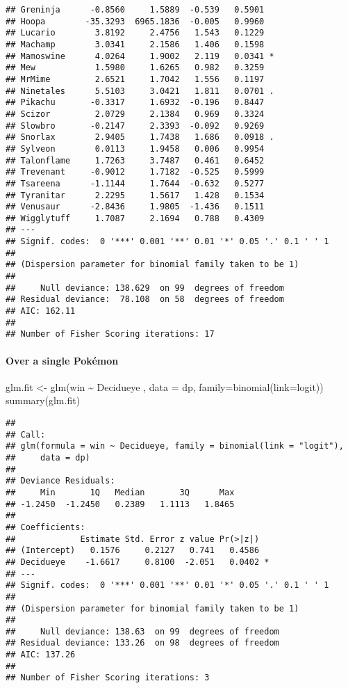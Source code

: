 \documentclass[
]{article}
\newenvironment{Shaded}{\begin{snugshade}}{\end{snugshade}}
\newcommand{\AttributeTok}[1]{\textcolor[rgb]{0.77,0.63,0.00}{#1}}
\newcommand{\FunctionTok}[1]{\textcolor[rgb]{0.00,0.00,0.00}{#1}}
\newcommand{\NormalTok}[1]{#1}
\newcommand{\OtherTok}[1]{\textcolor[rgb]{0.56,0.35,0.01}{#1}}
\newcommand{\SpecialCharTok}[1]{\textcolor[rgb]{0.00,0.00,0.00}{#1}}
\newcommand{\StringTok}[1]{\textcolor[rgb]{0.31,0.60,0.02}{#1}}
\begin{document}
\begin{verbatim}
## Greninja      -0.8560     1.5889  -0.539   0.5901  
## Hoopa        -35.3293  6965.1836  -0.005   0.9960  
## Lucario        3.8192     2.4756   1.543   0.1229  
## Machamp        3.0341     2.1586   1.406   0.1598  
## Mamoswine      4.0264     1.9002   2.119   0.0341 *
## Mew            1.5980     1.6265   0.982   0.3259  
## MrMime         2.6521     1.7042   1.556   0.1197  
## Ninetales      5.5103     3.0421   1.811   0.0701 .
## Pikachu       -0.3317     1.6932  -0.196   0.8447  
## Scizor         2.0729     2.1384   0.969   0.3324  
## Slowbro       -0.2147     2.3393  -0.092   0.9269  
## Snorlax        2.9405     1.7438   1.686   0.0918 .
## Sylveon        0.0113     1.9458   0.006   0.9954  
## Talonflame     1.7263     3.7487   0.461   0.6452  
## Trevenant     -0.9012     1.7182  -0.525   0.5999  
## Tsareena      -1.1144     1.7644  -0.632   0.5277  
## Tyranitar      2.2295     1.5617   1.428   0.1534  
## Venusaur      -2.8436     1.9805  -1.436   0.1511  
## Wigglytuff     1.7087     2.1694   0.788   0.4309  
## ---
## Signif. codes:  0 '***' 0.001 '**' 0.01 '*' 0.05 '.' 0.1 ' ' 1
## 
## (Dispersion parameter for binomial family taken to be 1)
## 
##     Null deviance: 138.629  on 99  degrees of freedom
## Residual deviance:  78.108  on 58  degrees of freedom
## AIC: 162.11
## 
## Number of Fisher Scoring iterations: 17
\end{verbatim}

\hypertarget{over-a-single-pokuxe9mon}{%
\paragraph{Over a single Pokémon}\label{over-a-single-pokuxe9mon}}

\begin{Shaded}
\begin{Highlighting}[]
\NormalTok{glm.fit }\OtherTok{\textless{}{-}} \FunctionTok{glm}\NormalTok{(win }\SpecialCharTok{\textasciitilde{}}\NormalTok{ Decidueye , }\AttributeTok{data =}\NormalTok{ dp, }\AttributeTok{family=}\FunctionTok{binomial}\NormalTok{(}\AttributeTok{link=}\StringTok{\textquotesingle{}logit\textquotesingle{}}\NormalTok{))}
\FunctionTok{summary}\NormalTok{(glm.fit)}
\end{Highlighting}
\end{Shaded}

\begin{verbatim}
## 
## Call:
## glm(formula = win ~ Decidueye, family = binomial(link = "logit"), 
##     data = dp)
## 
## Deviance Residuals: 
##     Min       1Q   Median       3Q      Max  
## -1.2450  -1.2450   0.2389   1.1113   1.8465  
## 
## Coefficients:
##             Estimate Std. Error z value Pr(>|z|)  
## (Intercept)   0.1576     0.2127   0.741   0.4586  
## Decidueye    -1.6617     0.8100  -2.051   0.0402 *
## ---
## Signif. codes:  0 '***' 0.001 '**' 0.01 '*' 0.05 '.' 0.1 ' ' 1
## 
## (Dispersion parameter for binomial family taken to be 1)
## 
##     Null deviance: 138.63  on 99  degrees of freedom
## Residual deviance: 133.26  on 98  degrees of freedom
## AIC: 137.26
## 
## Number of Fisher Scoring iterations: 3
\end{verbatim}
\end{document}
